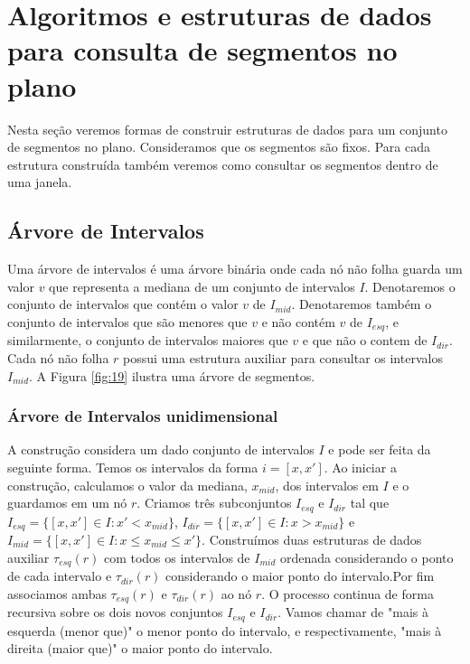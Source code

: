 \chapter{Algoritmos e estruturas de dados para consulta de segmentos no plano}
Nesta seção veremos formas de construir estruturas de dados para um conjunto de segmentos no plano. Consideramos que os segmentos são fixos. Para cada estrutura construída também veremos como consultar os segmentos dentro de uma janela.

\section{Árvore de Intervalos}
Uma árvore de intervalos é uma árvore binária onde cada nó não folha guarda um valor $v$ que representa a mediana de um conjunto de intervalos $I$. Denotaremos o conjunto de intervalos que contém o valor $v$ de $I_{mid}$. Denotaremos também o conjunto de intervalos que são menores que $v$ e não contém $v$ de $I_{esq}$, e similarmente, o conjunto de intervalos maiores que $v$ e que não o contem de $I_{dir}$. Cada nó não folha $r$ possui uma estrutura auxiliar para consultar os intervalos $I_{mid}$. A Figura \ref{fig:19} ilustra uma árvore de segmentos.
 
\subsection{Árvore de Intervalos unidimensional}
A construção considera um dado conjunto de intervalos $I$ e pode ser feita da seguinte forma. Temos os intervalos da forma $i = [x,x']$. Ao iniciar a construção, calculamos o valor da mediana, $x_{mid}$, dos intervalos em $I$ e o guardamos em um nó $r$. Criamos três subconjuntos $I_{esq}$ e $I_{dir}$ tal que $I_{esq} = \{[x, x'] \in I : x' < x_{mid} \}$, $I_{dir} = \{[x, x'] \in I : x > x_{mid} \}$ e $I_{mid} = \{[x, x'] \in I : x \leq x_{mid} \leq x' \}$. Construímos duas estruturas de dados auxiliar $\tau_{esq}(r)$ com todos os intervalos de $I_{mid}$ ordenada considerando o ponto de cada intervalo e $\tau_{dir}(r)$ considerando o maior ponto do intervalo.Por fim associamos ambas  $\tau_{esq}(r)$  e  $\tau_{dir}(r)$ ao nó $r$. O processo continua de forma recursiva sobre os dois novos conjuntos $I_{esq}$ e $I_{dir}$. Vamos chamar de "mais à esquerda (menor que)" o menor ponto do intervalo, e respectivamente, "mais à direita (maior que)" o maior ponto do intervalo.

